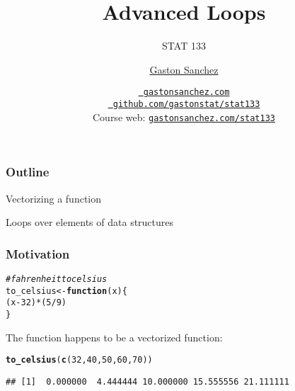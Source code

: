 \documentclass[12pt]{beamer}\usepackage[]{graphicx}\usepackage[]{color}
\title{Advanced Loops}
\subtitle{STAT 133}
\author{\href{http://www.gastonsanchez.com}{Gaston Sanchez}}
\institute{Department of Statistics, UC{\textendash}Berkeley}
\date{\href{http://www.gastonsanchez.com}{\tt \scriptsize \color{foreground} gastonsanchez.com}
\\[-4pt]
\href{http://github.com/gastonstat/stat133}{\tt \scriptsize \color{foreground} github.com/gastonstat/stat133}
\\[-4pt]
{\scriptsize Course web: \href{http://www.gastonsanchez.com/stat133}{\tt gastonsanchez.com/stat133}}
}
\makeatletter
\newcommand{\hlnum}[1]{\textcolor[rgb]{0.686,0.059,0.569}{#1}}%
\newcommand{\hlcom}[1]{\textcolor[rgb]{0.678,0.584,0.686}{\textit{#1}}}%
\newcommand{\hlopt}[1]{\textcolor[rgb]{0,0,0}{#1}}%
\newcommand{\hlstd}[1]{\textcolor[rgb]{0.345,0.345,0.345}{#1}}%
\newcommand{\hlkwa}[1]{\textcolor[rgb]{0.161,0.373,0.58}{\textbf{#1}}}%
\newcommand{\hlkwb}[1]{\textcolor[rgb]{0.69,0.353,0.396}{#1}}%
\newcommand{\hlkwc}[1]{\textcolor[rgb]{0.333,0.667,0.333}{#1}}%
\newcommand{\hlkwd}[1]{\textcolor[rgb]{0.737,0.353,0.396}{\textbf{#1}}}%
\newenvironment{kframe}{%
 \def\at@end@of@kframe{}%
 \ifinner\ifhmode%
  \def\at@end@of@kframe{\end{minipage}}%
  \begin{minipage}{\columnwidth}%
 \fi\fi%
 \def\FrameCommand##1{\hskip\@totalleftmargin \hskip-\fboxsep
 \colorbox{shadecolor}{##1}\hskip-\fboxsep
     \hskip-\linewidth \hskip-\@totalleftmargin \hskip\columnwidth}%
 \MakeFramed {\advance\hsize-\width
   \@totalleftmargin\z@ \linewidth\hsize
   \@setminipage}}%
 {\par\unskip\endMakeFramed%
 \at@end@of@kframe}
\newenvironment{knitrout}{}{} %
\makeatother
\begin{document}
{
  \frame{
    \titlepage
  } 
}


\begin{frame}
\begin{center}
\Huge{}
\end{center}
\end{frame}


\begin{frame}[fragile]
\frametitle{Outline}

\bbi
  \item Vectorizing a function
  \item Loops over elements of data structures
\ei

\end{frame}


\begin{frame}[fragile]
\frametitle{Motivation}

\begin{knitrout}\footnotesize
{}\color{fgcolor}\begin{kframe}
\begin{alltt}
\hlcom{# fahrenheit to celsius}
\hlstd{to_celsius} \hlkwb{<-} \hlkwa{function}\hlstd{(}\hlkwc{x}\hlstd{) \{}
  \hlstd{(x} \hlopt{-} \hlnum{32}\hlstd{)} \hlopt{*} \hlstd{(}\hlnum{5}\hlopt{/}\hlnum{9}\hlstd{)}
\hlstd{\}}
\end{alltt}
\end{kframe}
\end{knitrout}

The function  happens to be a vectorized function:
\begin{knitrout}\footnotesize
{}\color{fgcolor}\begin{kframe}
\begin{alltt}
\hlkwd{to_celsius}\hlstd{(}\hlkwd{c}\hlstd{(}\hlnum{32}\hlstd{,} \hlnum{40}\hlstd{,} \hlnum{50}\hlstd{,} \hlnum{60}\hlstd{,} \hlnum{70}\hlstd{))}
\end{alltt}
\begin{verbatim}
## [1]  0.000000  4.444444 10.000000 15.555556 21.111111
\end{verbatim}
\end{kframe}
\end{knitrout}

\end{frame}
\end{document}
